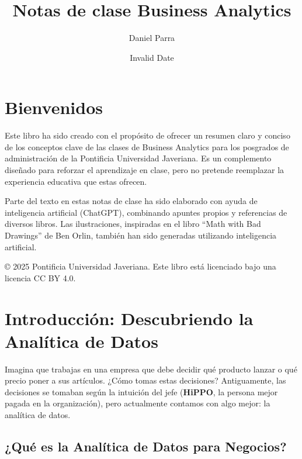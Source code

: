 \documentclass[
  spanish,
  letterpaper,
  DIV=11,
  numbers=noendperiod]{scrreprt}
\title{Notas de clase Business Analytics}
\author{Daniel Parra}
\date{Invalid Date}
\renewcommand*\contentsname{Tabla de contenidos}
\newcommand\contentsname{Tabla de contenidos}
\begin{document}
\maketitle

\renewcommand*\contentsname{Tabla de contenidos}
{
\hypersetup{linkcolor=}
\setcounter{tocdepth}{2}
\tableofcontents
}


\chapter*{Bienvenidos}\label{bienvenidos}


Este libro ha sido creado con el propósito de ofrecer un resumen claro y
conciso de los conceptos clave de las clases de Business Analytics para
los posgrados de administración de la Pontificia Universidad Javeriana.
Es un complemento diseñado para reforzar el aprendizaje en clase, pero
no pretende reemplazar la experiencia educativa que estas ofrecen.

Parte del texto en estas notas de clase ha sido elaborado con ayuda de
inteligencia artificial (ChatGPT), combinando apuntes propios y
referencias de diversos libros. Las ilustraciones, inspiradas en el
libro ``Math with Bad Drawings'' de Ben Orlin, también han sido
generadas utilizando inteligencia artificial.

© 2025 Pontificia Universidad Javeriana. Este libro está licenciado bajo
una licencia CC BY 4.0.


\chapter{Introducción: Descubriendo la Analítica de
Datos}\label{introducciuxf3n-descubriendo-la-analuxedtica-de-datos}

Imagina que trabajas en una empresa que debe decidir qué producto lanzar
o qué precio poner a sus artículos. ¿Cómo tomas estas decisiones?
Antiguamente, las decisiones se tomaban según la intuición del jefe
(\textbf{HiPPO}, la persona mejor pagada en la organización), pero
actualmente contamos con algo mejor: la analítica de datos.

\section{¿Qué es la Analítica de Datos para
Negocios?}\label{quuxe9-es-la-analuxedtica-de-datos-para-negocios}
\end{document}
